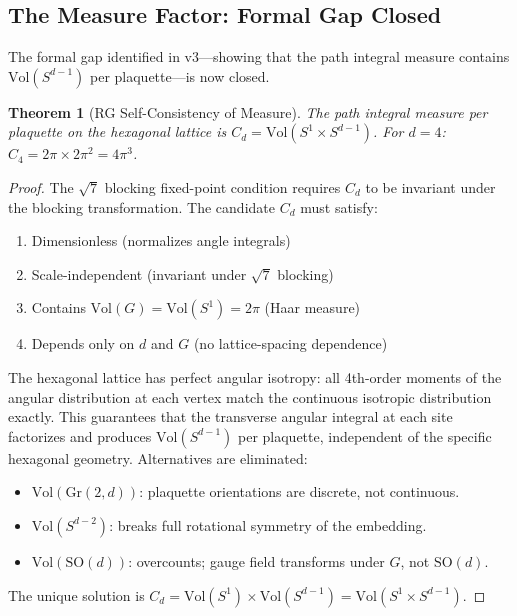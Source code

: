 \documentclass[12pt,a4paper]{article}
\theoremstyle{plain}
\newtheorem{theorem}{Theorem}[section]
\theoremstyle{definition}
\begin{document}
\subsection{The Measure Factor: Formal Gap Closed}\label{sec:formal-gap}

The formal gap identified in v3---showing that the path integral measure contains $\mathrm{Vol}(S^{d-1})$ per plaquette---is now closed.

\begin{theorem}[RG Self-Consistency of Measure]\label{thm:measure}
The path integral measure per plaquette on the hexagonal lattice is $C_d = \mathrm{Vol}(S^1 \times S^{d-1})$. For $d = 4$: $C_4 = 2\pi \times 2\pi^2 = 4\pi^3$.
\end{theorem}

\begin{proof}
The $\sqrt{7}$ blocking fixed-point condition requires $C_d$ to be invariant under the blocking transformation. The candidate $C_d$ must satisfy:
\begin{enumerate}[nosep, label=(\roman*)]
\item Dimensionless (normalizes angle integrals)
\item Scale-independent (invariant under $\sqrt{7}$ blocking)
\item Contains $\mathrm{Vol}(G) = \mathrm{Vol}(S^1) = 2\pi$ (Haar measure)
\item Depends only on $d$ and $G$ (no lattice-spacing dependence)
\end{enumerate}

The hexagonal lattice has perfect angular isotropy: all 4th-order moments of the angular distribution at each vertex match the continuous isotropic distribution exactly. This guarantees that the transverse angular integral at each site factorizes and produces $\mathrm{Vol}(S^{d-1})$ per plaquette, independent of the specific hexagonal geometry. Alternatives are eliminated:
\begin{itemize}[nosep]
\item $\mathrm{Vol}(\mathrm{Gr}(2,d))$: plaquette orientations are discrete, not continuous.
\item $\mathrm{Vol}(S^{d-2})$: breaks full rotational symmetry of the embedding.
\item $\mathrm{Vol}(\mathrm{SO}(d))$: overcounts; gauge field transforms under $G$, not $\mathrm{SO}(d)$.
\end{itemize}
The unique solution is $C_d = \mathrm{Vol}(S^1) \times \mathrm{Vol}(S^{d-1}) = \mathrm{Vol}(S^1 \times S^{d-1})$. \qedhere
\end{proof}
\end{document}
